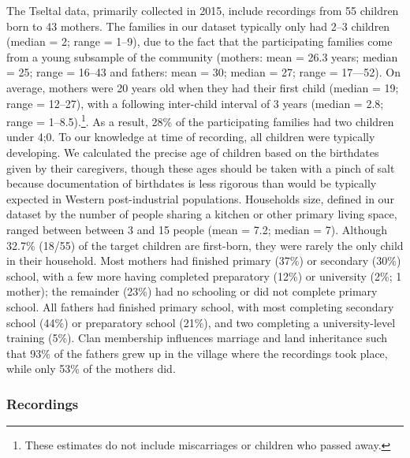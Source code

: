 \documentclass[floatsintext,man]{apa6}
\theoremstyle{definition}
\theoremstyle{definition}
\theoremstyle{definition}
\theoremstyle{remark}
\begin{document}
The Tseltal data, primarily collected in 2015, include recordings from
55 children born to 43 mothers. The families in our dataset typically
only had 2--3 children (median = 2; range = 1--9), due to the fact that
the participating families come from a young subsample of the community
(mothers: mean = 26.3 years; median = 25; range = 16--43 and fathers:
mean = 30; median = 27; range = 17---52). On average, mothers were 20
years old when they had their first child (median = 19; range = 12--27),
with a following inter-child interval of 3 years (median = 2.8; range =
1--8.5).\footnote{These estimates do not include miscarriages or
  children who passed away.}. As a result, 28\% of the participating
families had two children under 4;0. To our knowledge at time of
recording, all children were typically developing. We calculated the
precise age of children based on the birthdates given by their
caregivers, though these ages should be taken with a pinch of salt
because documentation of birthdates is less rigorous than would be
typically expected in Western post-industrial populations. Households
size, defined in our dataset by the number of people sharing a kitchen
or other primary living space, ranged between between 3 and 15 people
(mean = 7.2; median = 7). Although 32.7\% (18/55) of the target children
are first-born, they were rarely the only child in their household. Most
mothers had finished primary (37\%) or secondary (30\%) school, with a
few more having completed preparatory (12\%) or university (2\%; 1
mother); the remainder (23\%) had no schooling or did not complete
primary school. All fathers had finished primary school, with most
completing secondary school (44\%) or preparatory school (21\%), and two
completing a university-level training (5\%). Clan membership influences
marriage and land inheritance such that 93\% of the fathers grew up in
the village where the recordings took place, while only 53\% of the
mothers did.

\subsubsection{Recordings}\label{methods-corpus-recs}
\end{document}
